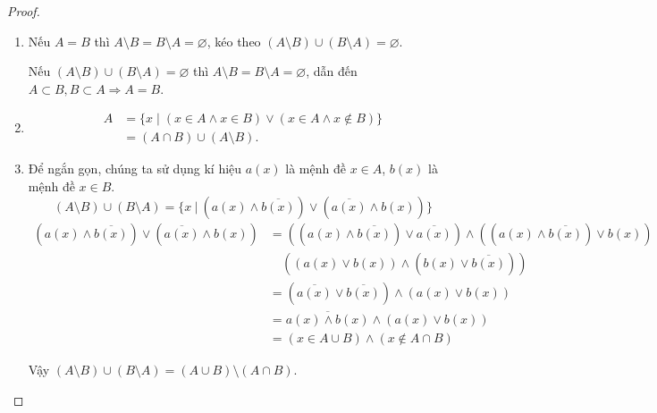 \begin{proof}
    \begin{enumerate}[label = (\alph*)]
        \item Nếu $A = B$ thì $A\setminus B = B\setminus A = \varnothing$, kéo theo $(A\setminus B)\cup (B\setminus A) = \varnothing$.

              Nếu $(A\setminus B)\cup (B\setminus A) = \varnothing$ thì $A\setminus B = B\setminus A = \varnothing$, dẫn đến $A\subset B, B\subset A\Rightarrow A = B$.

        \item \begin{align*}
                  A & = \{ x \mid (x\in A \land x\in B) \lor (x\in A \land x\not\in B) \} \\
                    & = (A\cap B) \cup (A\setminus B).
              \end{align*}

        \item Để ngắn gọn, chúng ta sử dụng kí hiệu $a(x)$ là mệnh đề $x \in A$, $b(x)$ là mệnh đề $x\in B$.
              $$
                  (A\setminus B)\cup (B\setminus A)=\{ x\ |\ (a(x) \land \overline{b(x)}) \lor (\overline{a(x)} \land b(x)) \}
              $$
              \begingroup
              \allowdisplaybreaks
              \begin{align*}
                  (a(x) \land \overline{b(x)}) \lor (\overline{a(x)} \land b(x)) & = ((a(x)\land \overline{b(x)})\lor \overline{a(x)}) \land ((a(x)\land \overline{b(x)})\lor b(x)) \\
                                                                                   & \quad ((a(x)\lor b(x))\land (b(x)\lor \overline{b(x)}))                                            \\
                                                                                   & = (\overline{a(x)}\lor\overline{b(x)}) \land (a(x) \lor b(x))                                      \\
                                                                                   & = \overline{a(x)\land b(x)} \land (a(x)\lor b(x))                                                 \\
                                                                                   & = (x\in A\cup B) \land (x\not\in A\cap B)
              \end{align*}
              \endgroup

              Vậy $(A\setminus B)\cup (B\setminus A) = (A\cup B)\setminus (A\cap B)$.


\end{enumerate}
\end{proof}
